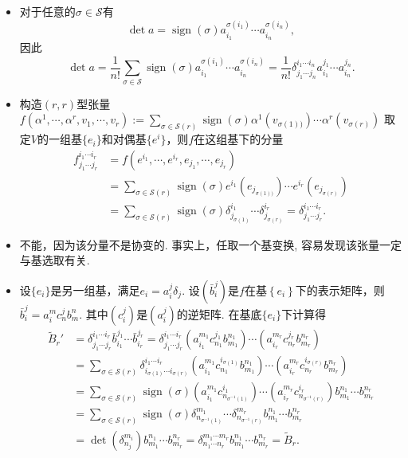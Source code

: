 \begin{itemize}
	\item[33.]
    对于任意的$\sigma\in\mathscr{S}$有
    \[
        \det a=\operatorname{sign}(\sigma)a_{i_1}^{\sigma(i_1)}\cdots a_{i_n}^{\sigma(i_n)},
    \]
    因此
    \[
        \det a=\frac{1}{n!}\sum_{\sigma\in\mathscr{S}}\operatorname{sign}(\sigma)a_{i_1}^{\sigma(i_1)}\cdots a_{i_n}^{\sigma(i_n)}
    =\frac{1}{n!}\delta_{j_1\cdots j_n}^{i_1\cdots i_n}a_{i_1}^{j_1}\cdots a_{i_n}^{j_n}.
    \]

    \item[34.] 构造$(r,r)$型张量$f(\alpha^1,\cdots,\alpha^r,v_1,\cdots,v_r):= \sum_{\sigma\in \mathscr{S}(r)} \operatorname{sign}(\sigma) \alpha^1(v_{\sigma(1))}) \cdots \alpha^r(v_{\sigma(r)})$
    取定$V$的一组基$\{e_i\}$和对偶基$\{e^i\}$，则$f$在这组基下的分量
    \begin{align*}
        f_{j_1\cdots j_r}^{i_1\cdots i_r} & = f(e^{i_1},\cdots, e^{i_r},e_{j_1},\cdots,e_{j_r})\\
        & = \sum_{\sigma \in \mathscr{S}(r)} \operatorname{sign}(\sigma) e^{i_1}(e_{j_{\sigma(1))}}) \cdots e^{i_r}(e_{j_{\sigma(r)}})\\
        & = \sum_{\sigma \in \mathscr{S}(r)} \operatorname{sign}(\sigma) \delta^{i_1}_{j_{\sigma(1)}}\cdots \delta^{i_r}_{j_{\sigma(r)}}=\delta^{i_1 \cdots i_r}_{j_1 \cdots j_r}.
    \end{align*}

    \item[35.]
    不能，因为该分量不是协变的. 事实上，任取一个基变换, 容易发现该张量一定与基选取有关.

    \item[36.] 设$\{ e_i \}$是另一组基，满足$e_i=a_i^j \delta_j$. 设$(\bar{b}_i^j)$是$f$在基$\left\{ e_i \right\}$下的表示矩阵，则$\bar{b}_i^j =a_i^m c_n^j b_m^n$.
    其中$(c_i^j)$是$(a_i^j)$的逆矩阵. 在基底$\{ e_i \}$下计算得
    \begin{align*}
        \tilde{B}_r' & = \delta_{j_1 \cdots j_r}^{i_1 \cdots i_r}\bar{b}_{i_1}^{j_1} \cdots \bar{b}_{i_r}^{j_r} = \delta_{j_1 \cdots j_r}^{i_1 \cdots i_r}(a_{i_1}^{m_1}c_{n_1}^{j_1}b_{m_1}^{n_1})\cdots(a_{i_r}^{m_r}c_{n_r}^{j_r}b_{m_r}^{n_r})\\
        & = \sum_{\sigma \in \mathscr{S}(r)} \delta_{i_{\sigma(1)}\cdots i_{\sigma(r)}}^{i_1\cdots i_r} (a_{i_1}^{m_1}c_{n_1}^{i_{\sigma(1)}}b_{m_1}^{n_1})\cdots(a_{i_r}^{m_r}c_{n_r}^{i_{\sigma(r)}}b_{m_r}^{n_r}) \\
        & = \sum_{\sigma \in \mathscr{S}(r)} \operatorname{sign}(\sigma)(a_{i_1}^{m_1}c_{n_{\sigma^{-1}(1)}}^{i_1})\cdots(a_{i_r}^{m_r}c_{n_{\sigma^{-1}(r)}}^{i_r}) b_{m_1}^{n_1}\cdots b_{m_r}^{n_r}\\
        & = \sum_{\sigma \in \mathscr{S}(r)} \operatorname{sign}(\sigma) \delta_{n_{\sigma^{-1}(1)}}^{m_1} \cdots \delta_{n_{\sigma^{-1}(r)}}^{m_r} b_{m_1}^{n_1} \cdots b_{m_r}^{n_r}\\
        & = \det(\delta_{n_j}^{m_i}) b_{m_1}^{n_1} \cdots b_{m_r}^{n_r} = \delta_{n_1\cdots n_r}^{m_1\cdots m_r}b_{m_1}^{n_1}\cdots b_{m_r}^{n_r} =\tilde{B}_r.
    \end{align*}




\end{itemize}
